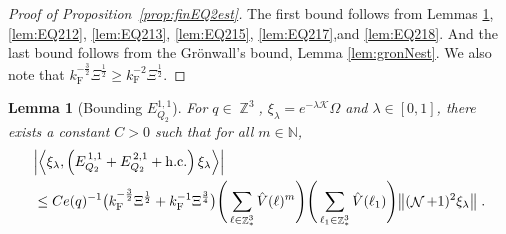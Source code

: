 \documentclass[12pt,a4paper]{article}
\numberwithin{equation}{section}
\newcommand{\cK}{\mathcal{K}}
\newcommand{\NNN}{\mathbb{N}}
\newcommand{\1}{\mathbb{I}}
\newcommand{\F}{\mathrm{F}}
\DeclareMathOperator{\Z}{\mathbb{Z}}
\DeclareMathOperator{\NN}{\mathcal{N}}
\newcommand{\half}{\frac{1}{2}}
\newcommand{\eva}[1]{\left\langle #1 \right\rangle}
\theoremstyle{plain}
\newtheorem{lemma}[theorem]{Lemma}
\theoremstyle{definition}
\theoremstyle{remark}
\theoremstyle{plain}
\theoremstyle{definition}
\theoremstyle{remark}
\begin{document}
\begin{proof}[Proof of Proposition~\ref{prop:finEQ2est}]
    	The first bound follows from Lemmas \ref{lem:EQ211}, \ref{lem:EQ212}, \ref{lem:EQ213}, \ref{lem:EQ215}, \ref{lem:EQ217},and \ref{lem:EQ218}. And the last bound follows from the Gr\"onwall's bound, Lemma \ref{lem:gronNest}. We also note that $k_{\F}^{-\frac{3}{2}} \Xi^\half 
    	\geq k_{\F}^{-2} \Xi^\half $. 
\end{proof}


\begin{lemma}[Bounding $E_{Q_2}^{1,1}$]\label{lem:EQ211}
For $ q \in \Z^3 $, $\xi_\lambda = e^{-\lambda \cK} \Omega$ and $ \lambda \in [0,1] $, there exists a constant $ C > 0 $ such that for all $ m \in \NNN $,
\begin{align}
	&\abs{\eva{\xi_\lambda,\left(E^{\,1,1}_{Q_2}+E^{\,2,1}_{Q_2}+\mathrm{h.c.}\right) \xi_\lambda }} \nonumber \\
	&\leq C e(q)^{-1} \big( k_{\F}^{-\frac{3}{2}} \Xi^\half 
		+ k_{\F}^{-1}\Xi^{\frac{3}{4}} \big)
		\Bigg(\sum\limits_{\ell \in \Z^3_*} \hat{V}(\ell)^m\Bigg)
		\Bigg( \sum\limits_{\ell_1 \in \Z^3_*} \hat{V}(\ell_1) \Bigg) \norm { (\NN+1)^2 \xi_\lambda } \;. \label{eq:estEQ211}
\end{align}
\end{lemma}
\end{document}

